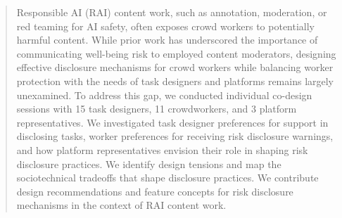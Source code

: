 \begin{abstract}
Responsible AI (RAI) content work, such as annotation, moderation, or red teaming for AI safety, often exposes crowd workers to potentially harmful content. While prior work has underscored the importance of communicating well-being risk to employed content moderators, designing effective disclosure mechanisms for crowd workers while balancing worker protection with the needs of task designers and platforms remains largely unexamined. To address this gap, we conducted individual co-design sessions with 15 task designers, 11 crowdworkers, and 3 platform representatives. We investigated task designer preferences for support in disclosing tasks, worker preferences for receiving risk disclosure warnings, and how platform representatives envision their role in shaping risk disclosure practices. We identify design tensions and map the sociotechnical tradeoffs that shape disclosure practices. We contribute design recommendations and feature concepts for risk disclosure mechanisms in the context of RAI content work. 
\end{abstract}
